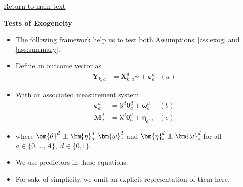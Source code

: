 \documentclass[static]{JJH-Beamer}
\newcommand\independent{\protect\mathpalette{\protect\independenT}{\perp}}
\def\independenT#1#2{\mathrel{\rlap{$#1#2$}\mkern2mu{#1#2}}}
\begin{document}
\begin{frame}
 \addtocounter{framenumber}{-1}

\begin{center}
\hyperlink{ret:protein}{\underline{Return to main text}}
\end{center}

\end{frame}

\begin{frame}
 \addtocounter{framenumber}{-1}

\hypertarget{tarttarttart}{}
\begin{center}
\textbf{Tests of Exogeneity}
\end{center}

\end{frame}

\begin{frame}
 \addtocounter{framenumber}{-1}

\begin{itemize}
\item The following framework help us to test both Assumptions~\ref{ass:exog} and \ref{ass:summary}.
\item Define an outcome vector as
    \begin{align}
    \bm{Y}_{k,a} &= \bm{X}^d_{k,a} \bm{\gamma} + \bm{\varepsilon}^d_a  &(a) \nonumber
    \end{align}
\end{itemize}

\end{frame}

\begin{frame}
 \addtocounter{framenumber}{-1}

\begin{itemize}
\item With an associated measurement system
    \begin{align}  \label{eq:sa-msystemmain}
    \bm{\varepsilon}_{a}^d &=\bm{\beta}^d \bm{\theta}_{a}^d + \bm{\omega}_{a}^d  &(b) \nonumber \\
    \bm{M}_{a}^d &= \bm{\lambda}^d \bm{\theta}_{a}^d + \bm{\eta}_{a^d},  &(c)
    \end{align}
\item where $\bm{\theta}^d \independent \bm{\eta}_{a}^d, \bm{\omega}_{a}^d$ and $\bm{\eta}_{a}^d \independent \bm{\omega}_{a}^d$ for all $a \in \{0, \ldots, A \}, \; d \in \{0,1\}$.
\item We use predictors in these equations.
\item For sake of simplicity, we omit an explicit representation of them here.
\end{itemize}

\end{frame}
\end{document}
